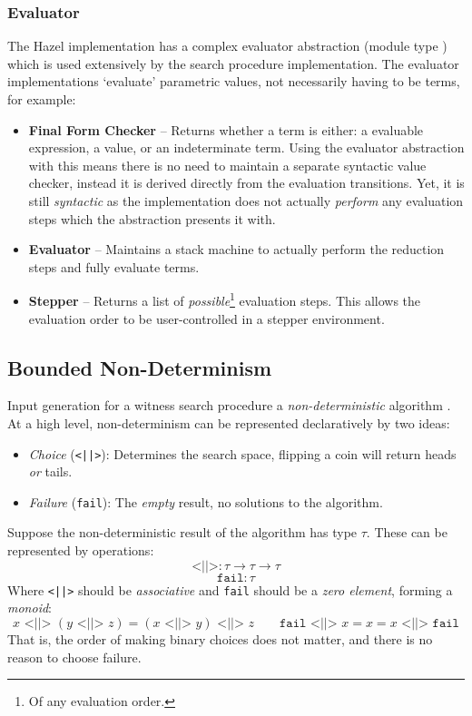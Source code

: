 \subsubsection{Evaluator}\label{sec:HazelEvaluator}
The Hazel implementation has a complex evaluator abstraction (module type ) which is used extensively by the search procedure implementation. The evaluator implementations `evaluate' parametric values, not necessarily having to be terms, for example:
\begin{itemize}
\item \textbf{Final Form Checker} -- Returns whether a term is either: a evaluable expression, a value, or an indeterminate term. Using the evaluator abstraction with this means there is no need to maintain a separate syntactic value checker, instead it is derived directly from the evaluation transitions. Yet, it is still \textit{syntactic} as the implementation does not actually \textit{perform} any evaluation steps which the abstraction presents it with.
\item \textbf{Evaluator} -- Maintains a stack machine to actually perform the reduction steps and fully evaluate terms.
\item \textbf{Stepper} -- Returns a list of \textit{possible}\footnote{Of any evaluation order.} evaluation steps. This allows the evaluation order to be user-controlled in a stepper environment.
\end{itemize}

\subsection{Bounded Non-Determinism}\label{sec:Nondeterminism}
Input generation for a witness search procedure \cite{SearchProc} a \textit{non-deterministic} algorithm \cite{NondeterministicAlgorithms}. At a high level, non-determinism can be represented declaratively by two ideas:
\begin{itemize}
\item \textit{Choice} (\texttt{<||>}): Determines the search space, flipping a coin will return heads \textit{or} tails.
\item \textit{Failure} (\texttt{fail}): The \textit{empty} result, no solutions to the algorithm.
\end{itemize}
Suppose the non-deterministic result of the algorithm has type $\tau$. These can be represented by operations:
\[\texttt{<||>} : \tau \to \tau \to \tau\]
\[\texttt{fail} : \tau\]
Where \texttt{<||>} should be \textit{associative} and \texttt{fail} should be a \textit{zero element}, forming a \textit{monoid}:
\[x \texttt{ <||> } (y \texttt{ <||> } z) = (x \texttt{ <||> } y) \texttt{ <||> } z \qquad \texttt{fail} \texttt{ <||> } x = x = x \texttt{ <||> } \texttt{fail}\]
That is, the order of making binary choices does not matter, and there is no reason to choose failure.

